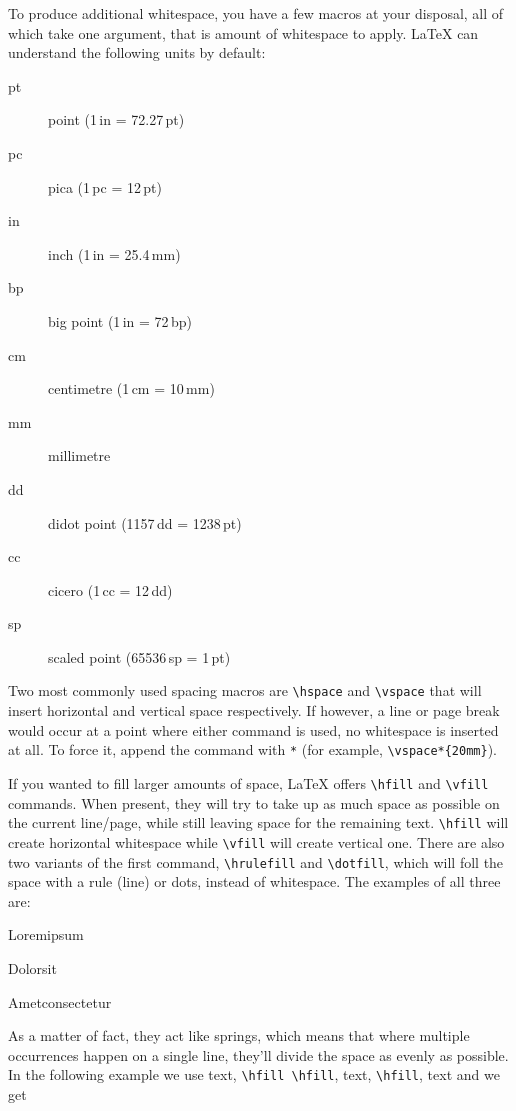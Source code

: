 To produce additional whitespace, you have a few macros at your disposal, all of which take one argument, that is amount of whitespace to apply. LaTeX can understand the following units by default:

\begin{description}
  \item[pt]  point         (1\,in = 72.27\,pt)
  \item[pc]  pica          (1\,pc = 12\,pt)
  \item[in]  inch          (1\,in = 25.4\,mm)
  \item[bp]  big point     (1\,in = 72\,bp)
  \item[cm]  centimetre    (1\,cm = 10\,mm)
  \item[mm]  millimetre
  \item[dd]  didot point   (1157\,dd = 1238\,pt)
  \item[cc]  cicero        (1\,cc = 12\,dd)
  \item[sp]  scaled point  (65536\,sp = 1\,pt)
\end{description}

Two most commonly used spacing macros are \verb|\hspace| and \verb|\vspace| that will insert horizontal and vertical space respectively. If however, a line or page break would occur at a point where either command is used, no whitespace is inserted at all. To force it, append the command with \verb|*| (for example, \verb|\vspace*{20mm}|).

If you wanted to fill larger amounts of space, LaTeX offers \verb|\hfill| and \verb|\vfill| commands. When present, they will try to take up as much space as possible on the current line/page, while still leaving space for the remaining text. \verb|\hfill| will create horizontal whitespace while \verb|\vfill| will create vertical one. There are also two variants of the first command, \verb|\hrulefill| and \verb|\dotfill|, which will foll the space with a rule (line) or dots, instead of whitespace. The examples of all three are:

Lorem\hfill ipsum

Dolor\hrulefill sit

Amet\dotfill consectetur

As a matter of fact, they act like springs, which means that where multiple occurrences happen on a single line, they'll divide the space as evenly as possible. In the following example we use text, \verb|\hfill \hfill|, text, \verb|\hfill|, text and we get

